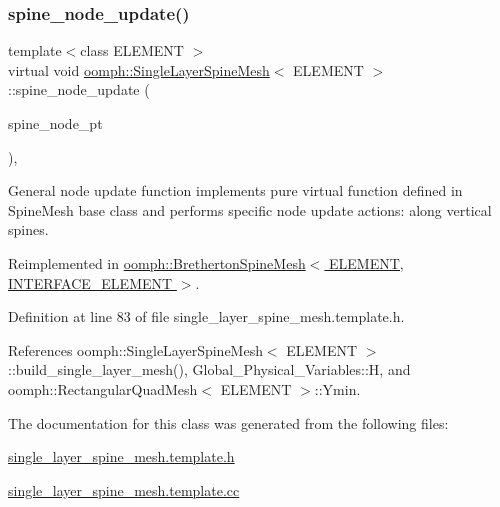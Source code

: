 \mbox{\label{classoomph_1_1SingleLayerSpineMesh_a364648c15ab29c0c8d1cf7c2bc4cb792}} 
\subsubsection{\texorpdfstring{spine\+\_\+node\+\_\+update()}{spine\_node\_update()}}
{\footnotesize\ttfamily template$<$class E\+L\+E\+M\+E\+NT $>$ \\
virtual void \hyperlink{classoomph_1_1SingleLayerSpineMesh}{oomph\+::\+Single\+Layer\+Spine\+Mesh}$<$ E\+L\+E\+M\+E\+NT $>$\+::spine\+\_\+node\+\_\+update (\begin{DoxyParamCaption}\item[{Spine\+Node $\ast$}]{spine\+\_\+node\+\_\+pt }\end{DoxyParamCaption})\hspace{0.3cm}{\ttfamily [inline]}, {\ttfamily [virtual]}}



General node update function implements pure virtual function defined in Spine\+Mesh base class and performs specific node update actions\+: along vertical spines. 



Reimplemented in \hyperlink{classoomph_1_1BrethertonSpineMesh_a981301706d4940cfb24d3d769a7a523b}{oomph\+::\+Bretherton\+Spine\+Mesh$<$ E\+L\+E\+M\+E\+N\+T, I\+N\+T\+E\+R\+F\+A\+C\+E\+\_\+\+E\+L\+E\+M\+E\+N\+T $>$}.



Definition at line 83 of file single\+\_\+layer\+\_\+spine\+\_\+mesh.\+template.\+h.



References oomph\+::\+Single\+Layer\+Spine\+Mesh$<$ E\+L\+E\+M\+E\+N\+T $>$\+::build\+\_\+single\+\_\+layer\+\_\+mesh(), Global\+\_\+\+Physical\+\_\+\+Variables\+::H, and oomph\+::\+Rectangular\+Quad\+Mesh$<$ E\+L\+E\+M\+E\+N\+T $>$\+::\+Ymin.



The documentation for this class was generated from the following files\+:\begin{DoxyCompactItemize}
\item 
\hyperlink{single__layer__spine__mesh_8template_8h}{single\+\_\+layer\+\_\+spine\+\_\+mesh.\+template.\+h}\item 
\hyperlink{single__layer__spine__mesh_8template_8cc}{single\+\_\+layer\+\_\+spine\+\_\+mesh.\+template.\+cc}\end{DoxyCompactItemize}
